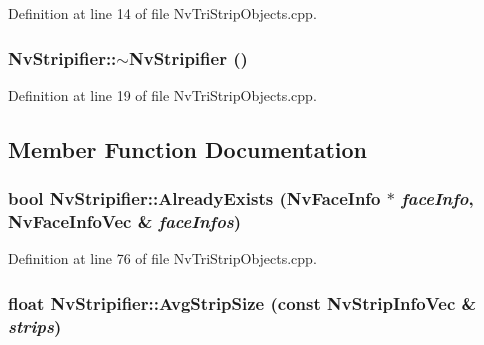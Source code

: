 Definition at line 14 of file NvTriStripObjects.cpp.\hypertarget{class_nv_stripifier_d01fb24dcd9da70c006e99e553545b4c}{
\subsubsection[{$\sim$NvStripifier}]{\setlength{\rightskip}{0pt plus 5cm}NvStripifier::$\sim$NvStripifier ()}}
\label{class_nv_stripifier_d01fb24dcd9da70c006e99e553545b4c}




Definition at line 19 of file NvTriStripObjects.cpp.

\subsection{Member Function Documentation}
\hypertarget{class_nv_stripifier_41b02b19ec351121bdd68b4d063d5526}{
\subsubsection[{AlreadyExists}]{\setlength{\rightskip}{0pt plus 5cm}bool NvStripifier::AlreadyExists ({\bf NvFaceInfo} $\ast$ {\em faceInfo}, \/  {\bf NvFaceInfoVec} \& {\em faceInfos})}}
\label{class_nv_stripifier_41b02b19ec351121bdd68b4d063d5526}




Definition at line 76 of file NvTriStripObjects.cpp.\hypertarget{class_nv_stripifier_7abe9874deba1964f2c019a1fc6ad0da}{
\subsubsection[{AvgStripSize}]{\setlength{\rightskip}{0pt plus 5cm}float NvStripifier::AvgStripSize (const {\bf NvStripInfoVec} \& {\em strips})}}
\label{class_nv_stripifier_7abe9874deba1964f2c019a1fc6ad0da}




